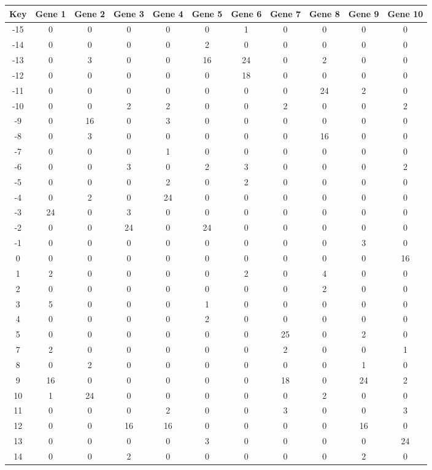 \begin{tabular}{|c|c|c|c|c|c|c|c|c|c|c|}
\hline
Key & Gene 1 & Gene 2 & Gene 3 & Gene 4 & Gene 5 & Gene 6 & Gene 7 & Gene 8 & Gene 9 & Gene 10 \\
\hline
-15 & 0 & 0 & 0 & 0 & 0 & 1 & 0 & 0 & 0 & 0 \\
-14 & 0 & 0 & 0 & 0 & 2 & 0 & 0 & 0 & 0 & 0 \\
-13 & 0 & 3 & 0 & 0 & 16 & 24 & 0 & 2 & 0 & 0 \\
-12 & 0 & 0 & 0 & 0 & 0 & 18 & 0 & 0 & 0 & 0 \\
-11 & 0 & 0 & 0 & 0 & 0 & 0 & 0 & 24 & 2 & 0 \\
-10 & 0 & 0 & 2 & 2 & 0 & 0 & 2 & 0 & 0 & 2 \\
-9 & 0 & 16 & 0 & 3 & 0 & 0 & 0 & 0 & 0 & 0 \\
-8 & 0 & 3 & 0 & 0 & 0 & 0 & 0 & 16 & 0 & 0 \\
-7 & 0 & 0 & 0 & 1 & 0 & 0 & 0 & 0 & 0 & 0 \\
-6 & 0 & 0 & 3 & 0 & 2 & 3 & 0 & 0 & 0 & 2 \\
-5 & 0 & 0 & 0 & 2 & 0 & 2 & 0 & 0 & 0 & 0 \\
-4 & 0 & 2 & 0 & 24 & 0 & 0 & 0 & 0 & 0 & 0 \\
-3 & 24 & 0 & 3 & 0 & 0 & 0 & 0 & 0 & 0 & 0 \\
-2 & 0 & 0 & 24 & 0 & 24 & 0 & 0 & 0 & 0 & 0 \\
-1 & 0 & 0 & 0 & 0 & 0 & 0 & 0 & 0 & 3 & 0 \\
0 & 0 & 0 & 0 & 0 & 0 & 0 & 0 & 0 & 0 & 16 \\
1 & 2 & 0 & 0 & 0 & 0 & 2 & 0 & 4 & 0 & 0 \\
2 & 0 & 0 & 0 & 0 & 0 & 0 & 0 & 2 & 0 & 0 \\
3 & 5 & 0 & 0 & 0 & 1 & 0 & 0 & 0 & 0 & 0 \\
4 & 0 & 0 & 0 & 0 & 2 & 0 & 0 & 0 & 0 & 0 \\
5 & 0 & 0 & 0 & 0 & 0 & 0 & 25 & 0 & 2 & 0 \\
7 & 2 & 0 & 0 & 0 & 0 & 0 & 2 & 0 & 0 & 1 \\
8 & 0 & 2 & 0 & 0 & 0 & 0 & 0 & 0 & 1 & 0 \\
9 & 16 & 0 & 0 & 0 & 0 & 0 & 18 & 0 & 24 & 2 \\
10 & 1 & 24 & 0 & 0 & 0 & 0 & 0 & 2 & 0 & 0 \\
11 & 0 & 0 & 0 & 2 & 0 & 0 & 3 & 0 & 0 & 3 \\
12 & 0 & 0 & 16 & 16 & 0 & 0 & 0 & 0 & 16 & 0 \\
13 & 0 & 0 & 0 & 0 & 3 & 0 & 0 & 0 & 0 & 24 \\
14 & 0 & 0 & 2 & 0 & 0 & 0 & 0 & 0 & 2 & 0 \\
\hline
\end{tabular}